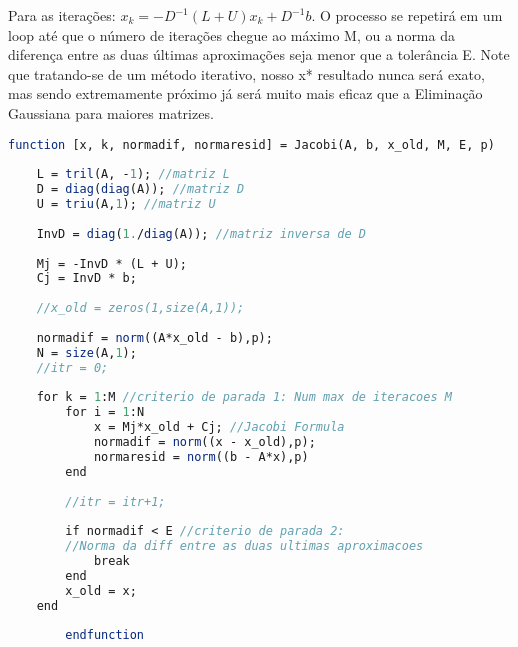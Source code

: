 \documentclass[leqno]{article}
\numberwithin{equation}{section}
\begin{document}
\begin{enumerate}
\begin{sol}
	Para as iterações: $x_k = -D^{-1}(L+U)x_k + D^{-1}b$. O processo se repetirá em um loop até que o número de iterações chegue ao máximo M, ou a norma da diferença entre as duas últimas aproximações seja menor que a tolerância E. Note que tratando-se de um método iterativo, nosso x* resultado nunca será exato, mas sendo extremamente próximo já será muito mais eficaz que a Eliminação Gaussiana para maiores matrizes.
	
		\begin{lstlisting}[language=Scilab]
	function [x, k, normadif, normaresid] = Jacobi(A, b, x_old, M, E, p)
				
	L = tril(A, -1); //matriz L
	D = diag(diag(A)); //matriz D
	U = triu(A,1); //matriz U
				
	InvD = diag(1./diag(A)); //matriz inversa de D
				
	Mj = -InvD * (L + U);
	Cj = InvD * b;
				
	//x_old = zeros(1,size(A,1));
				
	normadif = norm((A*x_old - b),p); 
	N = size(A,1);
	//itr = 0;
				
	for k = 1:M //criterio de parada 1: Num max de iteracoes M 
		for i = 1:N
			x = Mj*x_old + Cj; //Jacobi Formula
			normadif = norm((x - x_old),p);
			normaresid = norm((b - A*x),p)
		end
			
		//itr = itr+1;
				
		if normadif < E //criterio de parada 2: 
		//Norma da diff entre as duas ultimas aproximacoes
			break
		end
		x_old = x;
	end
				
		endfunction
		\end{lstlisting}
		\end{sol}
		
		

\end{enumerate}
\end{document}
